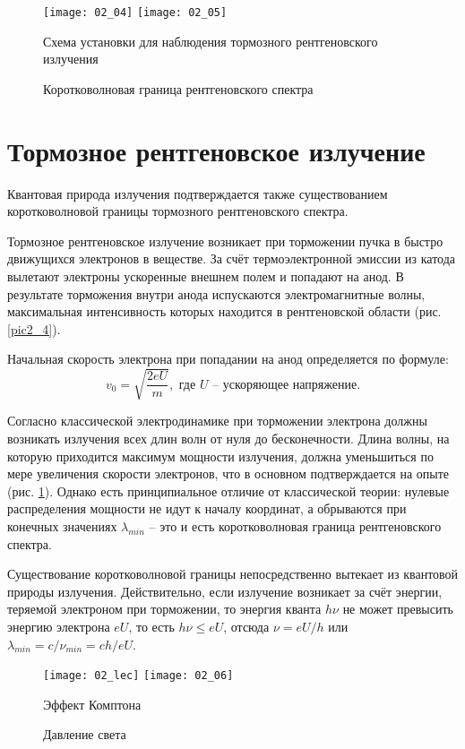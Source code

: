 \begin{figure}[h!]
    \center
    \texttt{[image: 02\_04]} \hfill
    \texttt{[image: 02\_05]}
    \parbox{.64\textwidth}{\caption{Схема установки для наблюдения тормозного
    рентгеновского излучения}\label{pic2_4}} \hfill
    \parbox{.32\textwidth}{\caption{Коротковолновая граница рентгеновского
    спектра}\label{pic2_5}}
\end{figure}

\section{Тормозное рентгеновское излучение}
Квантовая природа излучения подтверждается также существованием коротковолновой
границы тормозного рентгеновского спектра.

Тормозное рентгеновское излучение возникает при торможении пучка в быстро
движущихся электронов в веществе. За счёт термоэлектронной эмиссии из катода
вылетают электроны ускоренные внешнем полем и попадают на анод. В результате
торможения внутри анода испускаются электромагнитные волны, максимальная
интенсивность которых находится в рентгеновской области (рис. \ref{pic2_4}).

Начальная скорость электрона при попадании на анод определяется по формуле:
\[
    v_0 = \sqrt{\frac{2eU}{m}}, \text{ где } U \text{ -- ускоряющее напряжение}.
\]

Согласно классической электродинамике при торможении электрона должны возникать
излучения всех длин волн от нуля до бесконечности. Длина волны, на которую
приходится максимум мощности излучения, должна уменьшиться по мере увеличения
скорости электронов, что в основном подтверждается на опыте (рис. \ref{pic2_5}).
Однако есть принципиальное отличие от классической теории: нулевые распределения
мощности не идут к началу координат, а обрываются при конечных значениях
\( \lambda_{min} \) -- это и есть коротковолновая граница рентгеновского
спектра.

Существование коротковолновой границы непосредственно вытекает из квантовой
природы излучения. Действительно, если излучение возникает за счёт энергии,
теряемой электроном при торможении, то энергия кванта \( h\nu \) не может
превысить энергию электрона \( eU \), то есть \( h\nu \le eU \), отсюда
\( \nu = eU/h \) или \( \lambda_{min} = c/\nu_{min} = ch/eU \).

\begin{figure}[h!]
    \center
    \texttt{[image: 02\_lec]} \hfill
    \texttt{[image: 02\_06]}
    \parbox{.58\textwidth}{\caption{Эффект Комптона}\label{pic2_lec}} \hfill
    \parbox{.35\textwidth}{\caption{Давление света}\label{pic2_6}}
\end{figure}

